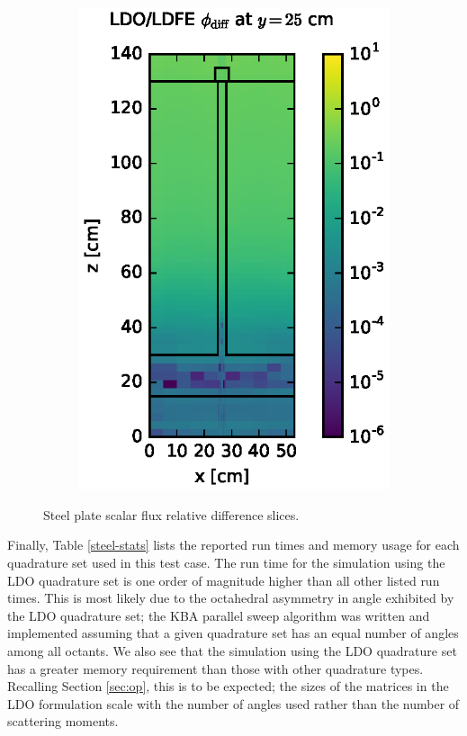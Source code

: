 \documentclass{article} %
\begin{document}
\begin{figure}[!htb]
\begin{subfigure}{0.4\textwidth}
\includegraphics[max height=0.445\textheight]
{steel-flux-diff-ldfe.eps}
\end{subfigure}
\caption{Steel plate scalar flux relative difference slices.}
\label{steel-fwd-diff-rel}
\end{figure}

Finally, Table \ref{steel-stats} lists the reported run times and memory usage
for each quadrature set used in this test case. The run time for the
simulation using the LDO quadrature set is one order of magnitude higher than
all other listed run times. This is most likely due to the octahedral
asymmetry in angle exhibited by the LDO quadrature set; the KBA parallel sweep
algorithm was written and implemented assuming that a given quadrature set has
an equal number of angles among all octants. We also see that the simulation
using the LDO quadrature set has a greater memory requirement than those with
other quadrature types. Recalling Section \ref{sec:op}, this is to be
expected; the sizes of the matrices in the LDO formulation scale with the
number of angles used rather than the number of scattering moments.
\end{document}
